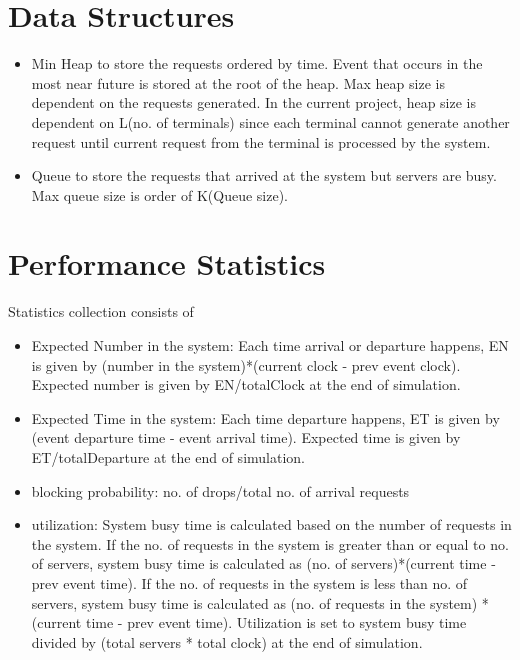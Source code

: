 \documentclass[11pt]{article}
\begin{document}
 \section{Data Structures }
 \begin{itemize}
 \item Min Heap to store the requests ordered by time. Event that occurs in the most near future is stored at the root of the heap. Max heap size is dependent on the requests generated.
 In the current project, heap size is dependent on L(no. of terminals) since each terminal cannot generate another request until current request from the terminal is processed by the system.
 \item Queue to store the requests that arrived at the system but servers are busy. Max queue size is order of K(Queue size).
 \end{itemize}
 
 \section{Performance Statistics}
 Statistics collection consists of
 \begin{itemize}
 \item Expected Number in the system: Each time arrival or departure happens, EN is given by (number in the system)*(current clock - prev event clock). Expected number is given by EN/totalClock at the end of simulation.
 \item Expected Time in the system: Each time departure happens, ET is given by (event departure time - event arrival time). Expected time is given by ET/totalDeparture at the end of simulation.
 \item blocking probability: no. of drops/total no. of arrival requests
 \item utilization: System busy time is calculated based on the number of requests in the system. If the no. of requests in the system is greater than or equal to no. of servers, system busy time is calculated as (no. of servers)*(current time - prev event time). If the no. of requests in the system is less than no. of servers, system busy time is calculated as (no. of requests in the system) * (current time - prev event time). Utilization is set to system busy time divided by (total servers * total clock) at the end of simulation.
 \end{itemize}
\end{document}

